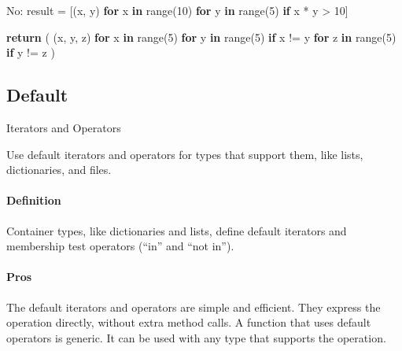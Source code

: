 \documentclass[
]{article}
\newenvironment{Shaded}{}{}
\newcommand{\BuiltInTok}[1]{\textcolor[rgb]{0.00,0.50,0.00}{#1}}
\newcommand{\ControlFlowTok}[1]{\textcolor[rgb]{0.00,0.44,0.13}{\textbf{#1}}}
\newcommand{\DecValTok}[1]{\textcolor[rgb]{0.25,0.63,0.44}{#1}}
\newcommand{\KeywordTok}[1]{\textcolor[rgb]{0.00,0.44,0.13}{\textbf{#1}}}
\newcommand{\NormalTok}[1]{#1}
\newcommand{\OperatorTok}[1]{\textcolor[rgb]{0.40,0.40,0.40}{#1}}
\begin{document}
\begin{samepage}
\begin{Shaded}
\begin{Highlighting}[]
\NormalTok{No:}
\NormalTok{  result }\OperatorTok{=}\NormalTok{ [(x, y) }\ControlFlowTok{for}\NormalTok{ x }\KeywordTok{in} \BuiltInTok{range}\NormalTok{(}\DecValTok{10}\NormalTok{) }\ControlFlowTok{for}\NormalTok{ y }\KeywordTok{in} \BuiltInTok{range}\NormalTok{(}\DecValTok{5}\NormalTok{) }\ControlFlowTok{if}\NormalTok{ x }\OperatorTok{*}\NormalTok{ y }\OperatorTok{\textgreater{}} \DecValTok{10}\NormalTok{]}

  \ControlFlowTok{return}\NormalTok{ (}
\NormalTok{      (x, y, z)}
      \ControlFlowTok{for}\NormalTok{ x }\KeywordTok{in} \BuiltInTok{range}\NormalTok{(}\DecValTok{5}\NormalTok{)}
      \ControlFlowTok{for}\NormalTok{ y }\KeywordTok{in} \BuiltInTok{range}\NormalTok{(}\DecValTok{5}\NormalTok{)}
      \ControlFlowTok{if}\NormalTok{ x }\OperatorTok{!=}\NormalTok{ y}
      \ControlFlowTok{for}\NormalTok{ z }\KeywordTok{in} \BuiltInTok{range}\NormalTok{(}\DecValTok{5}\NormalTok{)}
      \ControlFlowTok{if}\NormalTok{ y }\OperatorTok{!=}\NormalTok{ z}
\NormalTok{  )}
\end{Highlighting}
\end{Shaded}
\end{samepage}

\subsection{Default} Iterators and Operators

Use default iterators and operators for types that support them, like
lists, dictionaries, and files.

\paragraph{Definition}

Container types, like dictionaries and lists, define default iterators
and membership test operators (``in'' and ``not in'').

\paragraph{Pros}

The default iterators and operators are simple and efficient. They
express the operation directly, without extra method calls. A function
that uses default operators is generic. It can be used with any type
that supports the operation.
\end{document}
